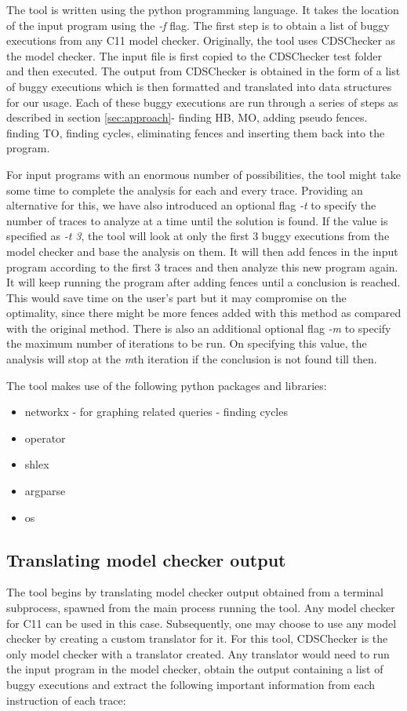 \par
The tool is written using the python programming language. It takes the location of the input program using the \textit{-f} flag. The first step is to obtain a list of buggy executions from any C11 model checker. Originally, the tool uses CDSChecker as the model checker. The input file is first copied to the CDSChecker test folder and then executed. The output from CDSChecker is obtained in the form of a list of buggy executions which is then formatted and translated into data structures for our usage. Each of these buggy executions are run through a series of steps as described in section \ref{sec:approach}- finding HB, MO, adding pseudo fences. finding TO, finding cycles, eliminating fences and inserting them back into the program.

For input programs with an enormous number of possibilities, the tool might take some time to complete the analysis for each and every trace. Providing an alternative for this, we have also introduced an optional flag \textit{-t} to specify the number of traces to analyze at a time until the solution is found. If the value is specified as \textit{-t 3}, the tool will look at only the first 3 buggy executions from the model checker and base the analysis on them. It will then add fences in the input program according to the first 3 traces and then analyze this new program again. It will keep running the program after adding fences until a conclusion is reached. This would save time on the user's part but it may compromise on the optimality, since there might be more fences added with this method as compared with the original method. There is also an additional optional flag \textit{-m} to specify the maximum number of iterations to be run. On specifying this value, the analysis will stop at the \textit{m}th iteration if the conclusion is not found till then.

The tool makes use of the following python packages and libraries:
\begin{itemize}
	\item networkx - for graphing related queries - finding cycles
	\item operator
	\item shlex
	\item argparse
	\item os
\end{itemize}

\subsection{Translating model checker output}
The tool begins by translating model checker output obtained from a terminal subprocess, spawned from the main process running the tool. Any model checker for C11 can be used in this case. Subsequently, one may choose to use any model checker by creating a custom translator for it. For this tool, CDSChecker is the only model checker with a translator created. Any translator would need to run the input program in the model checker, obtain the output containing a list of buggy executions and extract the following important information from each instruction of each trace:

